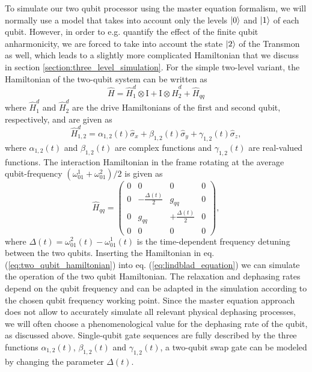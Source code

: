 To simulate our two qubit processor using the master equation formalism, we will normally use a model that takes into account only the levels $\left| 0 \right>$ and $\left| 1 \right>$ of each qubit. However, in order to e.g. quantify the effect of the finite qubit anharmonicity, we are forced to take into account the state $\left| 2 \right>$ of the Transmon as well, which leads to a slightly more complicated Hamiltonian that we discuss in section \ref{section:three_level_simulation}. For the simple two-level variant, the Hamiltonian of the two-qubit system can be written as
%
\begin{equation}
\hat{H} = \hat{H}_1^d\otimes\mathrm{I}+\mathrm{I}\otimes\hat{H}_2^d+\hat{H}_{qq} \label{eq:two_qubit_hamiltonian}
\end{equation}
%
where $\hat{H}_1^d$ and $\hat{H}_2^d$ are the drive Hamiltonians of the first and second qubit, respectively, and are given as
%
\begin{equation}
\hat{H}_{1,2}^d = \alpha_{1,2}(t)\hat{\sigma}_x+\beta_{1,2}(t)\hat{\sigma}_y+\gamma_{1,2}(t)\hat{\sigma}_z,
\end{equation}
%
where $\alpha_{1,2}(t)$ and $\beta_{1,2}(t)$ are complex functions and $\gamma_{1,2}(t)$ are real-valued functions. The interaction Hamiltonian in the frame rotating at the average qubit-frequency $(\omega_{01}^1+\omega_{01}^2)/2$ is given as
%
\begin{equation}
\hat{H}_{qq} = \left(\begin{array}{cccc}0 & 0 & 0 & 0 \\ 0 & -\frac{\Delta(t)}{2} & g_{qq} & 0 \\ 0 & g_{qq} & +\frac{\Delta(t)}{2} & 0 \\ 0 & 0 & 0 & 0 \end{array}\right),
\end{equation}
%
where $\Delta(t)=\omega_{01}^2(t)-\omega_{01}^1(t)$ is the time-dependent frequency detuning between the two qubits. Inserting the Hamiltonian in eq. (\ref{eq:two_qubit_hamiltonian}) into eq. (\ref{eq:lindblad_equation}) we can simulate the operation of the two qubit Hamiltonian. The relaxation and dephasing rates depend on the qubit frequency and can be adapted in the simulation according to the chosen qubit frequency working point. Since the master equation approach does not allow to accurately simulate all relevant physical dephasing processes, we will often choose a phenomenological value for the dephasing rate of the qubit, as discussed above. Single-qubit gate sequences are fully described by the three functions $\alpha_{1,2}(t)$, $\beta_{1,2}(t)$ and $\gamma_{1,2}(t)$, a two-qubit swap gate can be modeled by changing the parameter $\Delta(t)$.